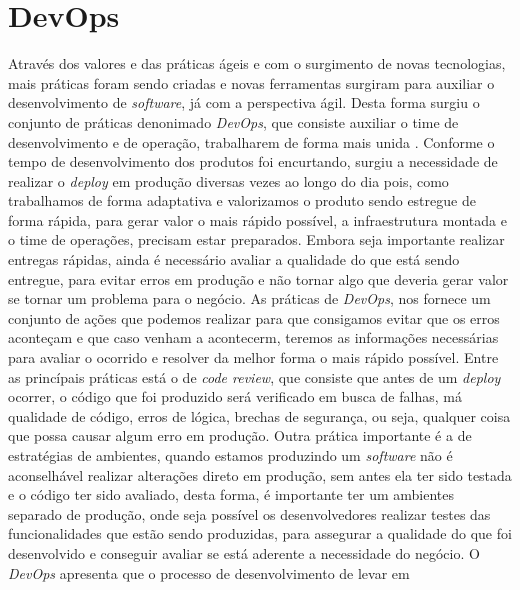   \chapter{DevOps}
    Através dos valores e das práticas ágeis e com o surgimento de novas
    tecnologias, mais práticas foram sendo criadas e novas ferramentas surgiram
    para auxiliar o desenvolvimento de \textit{software}, já com a perspectiva
    ágil. Desta forma surgiu o conjunto de práticas denonimado \textit{DevOps},
    que consiste auxiliar o time de desenvolvimento e de operação, trabalharem de
    forma mais unida \cite{TheDevOpsHandbook}. Conforme o tempo de desenvolvimento
    dos produtos foi encurtando, surgiu a necessidade de realizar o \textit{deploy}
    em produção diversas vezes ao longo do dia pois, como trabalhamos de forma
    adaptativa e valorizamos o produto sendo estregue de forma rápida, para gerar
    valor o mais rápido possível, a infraestrutura montada e o time de operações,
    precisam estar preparados. Embora seja importante realizar entregas rápidas,
    ainda é necessário avaliar a qualidade do que está sendo entregue, para
    evitar erros em produção e não tornar algo que deveria gerar valor se
    tornar um problema para o negócio. \newline
    As práticas de \textit{DevOps}, nos fornece um conjunto de ações que podemos
    realizar para que consigamos evitar que os erros aconteçam e que caso venham
    a acontecerm, teremos as informações necessárias para avaliar o ocorrido e
    resolver da melhor forma o mais rápido possível. \newline
    Entre as princípais práticas está o de \textit{code review}, que consiste
    que antes de um \textit{deploy} ocorrer, o código que foi produzido será
    verificado em busca de falhas, má qualidade de código, erros de lógica,
    brechas de segurança, ou seja, qualquer coisa que possa causar algum erro
    em produção. Outra prática importante é a de estratégias de ambientes,
    quando estamos produzindo um \textit{software} não é aconselhável realizar
    alterações direto em produção, sem antes ela ter sido testada e o código
    ter sido avaliado, desta forma, é importante ter um ambientes separado de
    produção, onde seja possível os desenvolvedores realizar testes das
    funcionalidades que estão sendo produzidas, para assegurar a qualidade do
    que foi desenvolvido e conseguir avaliar se está aderente a necessidade do
    negócio. \newline
    O \textit{DevOps} apresenta que o processo de desenvolvimento de levar em
